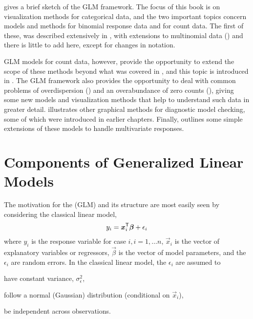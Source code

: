 \documentclass[11pt]{book}\usepackage[]{graphicx}\usepackage[]{color}
\begin{document}
 gives a brief sketch of the GLM framework.
The focus of this book is on visualization methods for categorical
data, and the two important topics concern models and methods for binomial response data
and for count data.  The first of these,
was described extensively in
,
with extensions to multinomial
data ()
and there is little to add here, except for changes
in notation.

GLM models for count data, however, provide the opportunity to extend
the scope of these methods beyond what was covered in ,
and this topic is introduced in .
The GLM framework also provides the opportunity to deal with common problems
of overdispersion () and an overabundance of
zero counts (), giving some new models and
visualization methods that help to understand such data in greater detail.
 illustrates other graphical methods for diagnostic
model checking, some of which were introduced in earlier chapters.
Finally,  outlines some simple extensions of these
models to handle multivariate responses.


\section{Components of Generalized Linear Models}\label{glm:components}

The motivation for the  (GLM) and its structure are most
easily seen by considering the classical linear model,
\begin{equation*}
y_i = \bm{x}_i^\mathsf{T} \bm{\beta} + \epsilon_i
\end{equation*}
where
$y_i$ is the response variable for case $i, i=1, \dots n$,
$\vec{x}_i$ is the vector of explanatory variables or regressors,
$\vec{\beta}$ is the vector of model parameters, and the
$\epsilon_i$ are random errors.
In the classical linear model, the $\epsilon_i$ are assumed to
\begin{seriate}
  \item have constant variance, $\sigma^2_\epsilon$,
  \item follow a normal (Gaussian) distribution (conditional on $\vec{x}_i$),
  \item be independent across observations.
\end{seriate}
\end{document}
